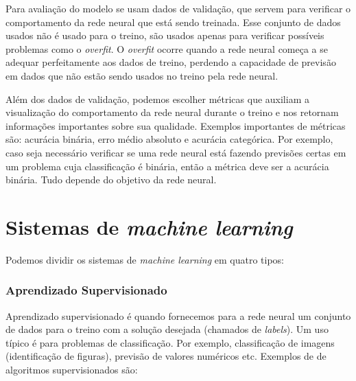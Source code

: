 \documentclass[a4paper,12pt,oneside]{book}
\begin{document}
\par Para avaliação do modelo se usam dados de validação, que servem para verificar o comportamento da rede neural que está sendo treinada. Esse conjunto de dados usados não é usado para o treino, são usados apenas para verificar possíveis problemas como o \textit{overfit}. O \textit{overfit} ocorre quando a rede neural começa a se adequar perfeitamente aos dados de treino, perdendo a capacidade de previsão em dados que não estão sendo usados no treino pela rede neural.

\par Além dos dados de validação, podemos escolher métricas que auxiliam a visualização do comportamento da rede neural durante o treino e nos retornam informações importantes sobre sua qualidade. Exemplos importantes de métricas são: acurácia binária, erro médio absoluto e acurácia categórica\cite{metrics}. Por exemplo, caso seja necessário verificar se uma rede neural está fazendo previsões certas em um problema cuja classificação é binária, então a métrica deve ser a acurácia binária. Tudo depende do objetivo da rede neural.

\section{Sistemas de \textit{machine learning}}

Podemos dividir os sistemas de \textit{machine learning} em quatro tipos:

\subsubsection*{Aprendizado Supervisionado}

\par Aprendizado supervisionado é quando fornecemos para a rede neural um conjunto de dados para o treino com a solução desejada (chamados de \textit{labels}). Um uso típico é para problemas de classificação\cite{mlbook}. Por exemplo, classificação de imagens (identificação de figuras), previsão de valores numéricos etc. Exemplos de de algoritmos supervisionados são:
\end{document}
